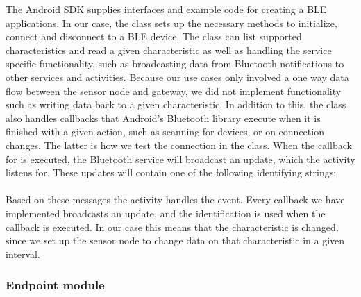 The Android SDK supplies interfaces and example code for creating a BLE applications. In our case, the  class sets up the necessary methods to initialize, connect and disconnect to a BLE device. The class can list supported characteristics and read a given characteristic as well as handling the service specific functionality, such as broadcasting data from Bluetooth notifications to other services and activities. Because our use cases only involved a one way data flow between the sensor node and gateway, we did not implement functionality such as writing data back to a given characteristic. In addition to this, the class also handles callbacks that Android's Bluetooth library execute when it is finished with a given action, such as scanning for devices, or on connection changes. The latter is how we test the connection in the  class. When the callback for  is executed, the Bluetooth service will broadcast an update, which the  activity listens for. These updates will contain one of the following identifying strings:\\
\newline
\noindent{}
\\
\noindent
Based on these messages the  activity handles the event. Every callback we have implemented broadcasts an update, and the  identification is used when the callback  is executed. In our case this means that the  characteristic is changed, since we set up the sensor node to change data on that characteristic in a given interval.


\subsubsection{Endpoint module} %
\label{ssub:endpoint_module}


